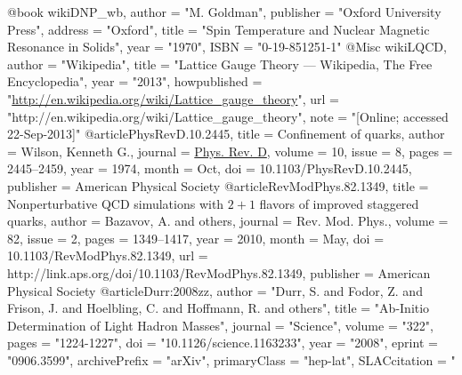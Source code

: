 @book{ wikiDNP_wb,
	author = "M. Goldman",
	publisher = "Oxford University Press",
	address = "Oxford",
	title = "Spin Temperature and Nuclear Magnetic Resonance in Solids",
	year = "1970",
	ISBN = "0-19-851251-1"
}
@Misc{ wikiLQCD,
  author = "Wikipedia",
  title = "Lattice Gauge Theory --- {W}ikipedia{,} The Free Encyclopedia",
  year = "2013",
  howpublished = "\url{http://en.wikipedia.org/wiki/Lattice_gauge_theory}",
  url = "http://en.wikipedia.org/wiki/Lattice_gauge_theory",
  note = "[Online; accessed 22-Sep-2013]"
}
@article{PhysRevD.10.2445,
  title = {Confinement of quarks},
  author = {Wilson, Kenneth G.},
  journal = {\href{http://link.aps.org/doi/10.1103/PhysRevD.10.2445}{Phys. Rev. D}},
  volume = {10},
  issue = {8},
  pages = {2445--2459},
  year = {1974},
  month = {Oct},
  doi = {10.1103/PhysRevD.10.2445},
  publisher = {American Physical Society}
}
@article{RevModPhys.82.1349,
  title = {Nonperturbative QCD simulations with $2+1$ flavors of improved staggered quarks},
  author = {Bazavov, A. and others},
  journal = {Rev. Mod. Phys.},
  volume = {82},
  issue = {2},
  pages = {1349--1417},
  year = {2010},
  month = {May},
  doi = {10.1103/RevModPhys.82.1349},
  url = {http://link.aps.org/doi/10.1103/RevModPhys.82.1349},
  publisher = {American Physical Society}
}
@article{Durr:2008zz,
      author         = "Durr, S. and Fodor, Z. and Frison, J. and Hoelbling, C.
                        and Hoffmann, R. and others",
      title          = "{Ab-Initio Determination of Light Hadron Masses}",
      journal        = "Science",
      volume         = "322",
      pages          = "1224-1227",
      doi            = "10.1126/science.1163233",
      year           = "2008",
      eprint         = "0906.3599",
      archivePrefix  = "arXiv",
      primaryClass   = "hep-lat",
      SLACcitation   = "%
}

